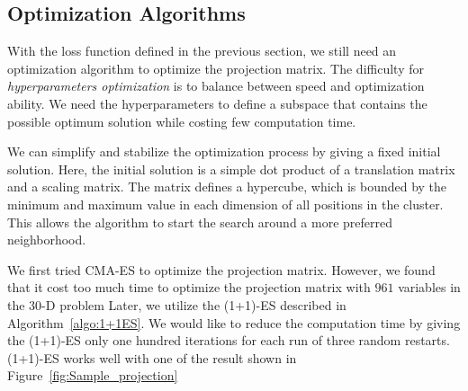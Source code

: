 




\subsection{Optimization Algorithms}

With the loss function defined in the previous section, 
we still need an optimization algorithm to optimize the projection matrix.
The difficulty for \textit{hyperparameters optimization} is to balance between speed and optimization ability.
We need the hyperparameters to define a subspace that contains the possible optimum solution while costing few computation time.

We can simplify and stabilize the optimization process by giving a fixed initial solution.
Here, the initial solution is a simple dot product of a translation matrix and a scaling matrix. 
The matrix defines a hypercube, which is bounded by the minimum and maximum value in each dimension of all positions in the cluster.
This allows the algorithm to start the search around a more preferred neighborhood.

We first tried CMA-ES to optimize the projection matrix.
However, we found that it cost too much time to optimize the projection matrix with $961$ variables in the $30$-D problem
Later, we utilize the (1+1)-ES described in Algorithm~\ref{algo:1+1ES}.
We would like to reduce the computation time by giving the (1+1)-ES only one hundred iterations for each run of three random restarts.
(1+1)-ES works well with one of the result shown in Figure~\ref{fig:Sample_projection}

